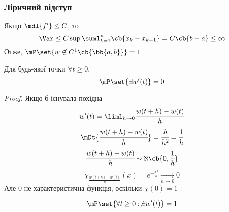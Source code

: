 \subsubsection{Ліричний відступ}
Якщо $\mdl{f'}\leq C$, то
\begin{equation}
\Var\leq C\sup \suml_{k=1}^n \cb{x_k-x_{k-1}} = C\cb{b-a} \leq \infty
\end{equation}
Отже, $\mP\set{w\not\in C^1 \cb{\bb{a,b}}}=1$
\begin{teor}
Для будь-якої точки $\forall t\geq 0$.
\begin{equation}
\mP\set{\exists w'(t)}  =0
\end{equation}
\end{teor}
\begin{proof}
Якщо б існувала похідна 
\begin{equation}
w'(t) = \liml_{h\to0} \cfrac{w(t+h)-w(t)}{h}
\end{equation}
\begin{equation}
\mDt{\cfrac{w(t+h)-w(t)}{h}} = \cfrac{h}{h^2} = \cfrac1h
\end{equation}
\begin{equation}
\cfrac{w(t+h)-w(t)}{h} \sim\aleph\cb{0,\cfrac1h}
\end{equation}
\begin{equation}
\chi_{\frac{w(t+h)-w(t)}{h}} (x) = e^{-\frac{x^2}h} \xrightarrow[h\to0]{} 0
\end{equation}
Але 0 не характеристична функція, оскільки $\chi(0)=1$
\end{proof}
\begin{teor}
\begin{equation}
\mP\set{\forall t\geq 0: \not\exists w'(t)} = 1
\end{equation}
\end{teor}